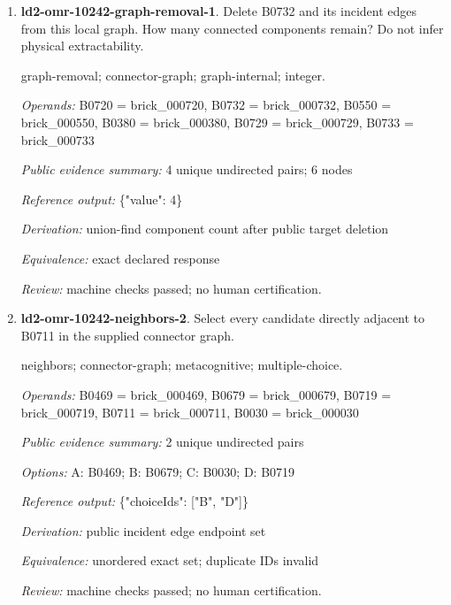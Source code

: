 \begin{enumerate}
\par{\small neighbors; connector-graph; metacognitive; multiple-choice.\par\textit{Operands:} B0729 = brick\_000729, B0550 = brick\_000550, B0380 = brick\_000380, B0720 = brick\_000720, B0733 = brick\_000733, B0732 = brick\_000732\par\textit{Public evidence summary:} 4 unique undirected pairs\par\textit{Options:} A: B0380; B: B0733; C: B0729; D: B0550; E: B0720\par\textit{Reference output:} \{"choiceIds": ["A", "B", "E"]\}\par\textit{Derivation:} public incident edge endpoint set\par\textit{Equivalence:} unordered exact set; duplicate IDs invalid\par\textit{Review:} machine checks passed; no human certification.}
\item \textbf{ld2-omr-10242-graph-removal-1}. Delete B0732 and its incident edges from this local graph. How many connected components remain? Do not infer physical extractability.
\par{\small graph-removal; connector-graph; graph-internal; integer.\par\textit{Operands:} B0720 = brick\_000720, B0732 = brick\_000732, B0550 = brick\_000550, B0380 = brick\_000380, B0729 = brick\_000729, B0733 = brick\_000733\par\textit{Public evidence summary:} 4 unique undirected pairs; 6 nodes\par\textit{Reference output:} \{"value": 4\}\par\textit{Derivation:} union-find component count after public target deletion\par\textit{Equivalence:} exact declared response\par\textit{Review:} machine checks passed; no human certification.}
\item \textbf{ld2-omr-10242-neighbors-2}. Select every candidate directly adjacent to B0711 in the supplied connector graph.
\par{\small neighbors; connector-graph; metacognitive; multiple-choice.\par\textit{Operands:} B0469 = brick\_000469, B0679 = brick\_000679, B0719 = brick\_000719, B0711 = brick\_000711, B0030 = brick\_000030\par\textit{Public evidence summary:} 2 unique undirected pairs\par\textit{Options:} A: B0469; B: B0679; C: B0030; D: B0719\par\textit{Reference output:} \{"choiceIds": ["B", "D"]\}\par\textit{Derivation:} public incident edge endpoint set\par\textit{Equivalence:} unordered exact set; duplicate IDs invalid\par\textit{Review:} machine checks passed; no human certification.}

\end{enumerate}
